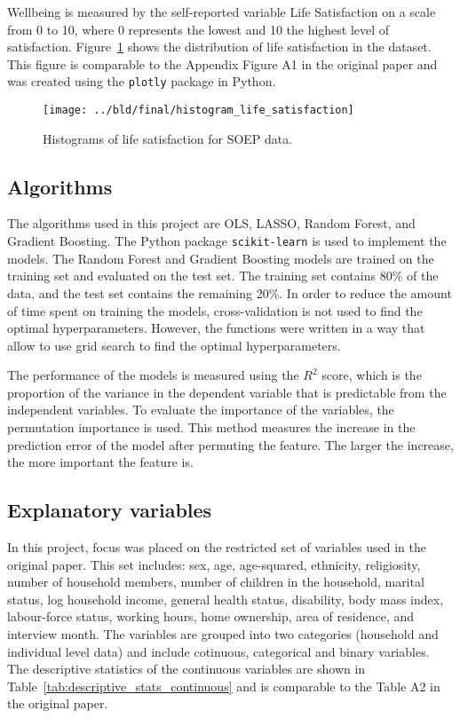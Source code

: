 \documentclass[11pt, a4paper, leqno]{article}
\begin{document}
Wellbeing is measured by the self-reported variable Life Satisfaction on a scale from 0
to 10, where 0 represents the lowest and 10 the highest level of satisfaction.
Figure~\ref{fig:histogram_life_satisfaction} shows the distribution of life satisfaction
in the dataset. This figure is comparable to the Appendix Figure A1 in the original paper
and was created using the \texttt{plotly} package in Python.

\begin{figure}[htbp]
    \centering
    \texttt{[image: ../bld/final/histogram\_life\_satisfaction]}
    \caption{Histograms of life satisfaction for SOEP data.}
    \label{fig:histogram_life_satisfaction}
\end{figure}

\subsection{Algorithms}

The algorithms used in this project are OLS, LASSO, Random Forest, and Gradient Boosting.
The Python package \texttt{scikit-learn} is used to implement the models. The Random Forest
and Gradient Boosting models are trained on the training set and evaluated on the test set.
The training set contains 80\% of the data, and the test set contains the remaining 20\%.
In order to reduce the amount of time spent on training the models, cross-validation is not
used to find the optimal hyperparameters. However, the functions were written in a way that
allow to use grid search to find the optimal hyperparameters.

The performance of the models is measured using the $R^2$ score, which is the proportion of
the variance in the dependent variable that is predictable from the independent variables.
To evaluate the importance of the variables, the permutation importance is used. This method
measures the increase in the prediction error of the model after permuting the feature. The
larger the increase, the more important the feature is.


\subsection{Explanatory variables}
In this project, focus was placed on the restricted set of variables used in the original
paper. This set includes: sex, age, age-squared, ethnicity, religiosity, number of household
members, number of children in the household, marital status, log household income, general
health status, disability, body mass index, labour-force status, working hours, home ownership,
area of residence, and interview month. The variables are grouped into two categories
(household and individual level data) and include cotinuous, categorical and binary variables.
The descriptive statistics of the continuous variables are shown in Table~\ref{tab:descriptive_stats_continuous}
and is comparable to the Table A2 in the original paper.
\end{document}
